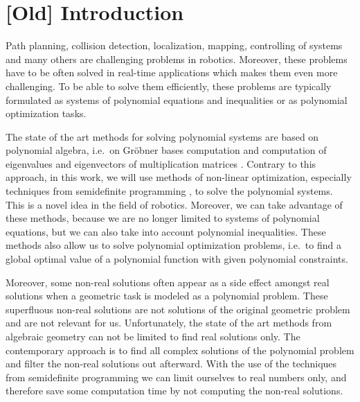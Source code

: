 \chapter{[Old] Introduction}
Path planning, collision detection, localization, mapping, controlling of systems and many others are challenging problems in robotics.
Moreover, these problems have to be often solved in real-time applications which makes them even more challenging.
To be able to solve them efficiently, these problems are typically formulated as systems of polynomial equations and inequalities or as polynomial optimization tasks.

The state of the art methods for solving polynomial systems are based on polynomial algebra, i.e.\ on Gr\"obner bases computation and computation of eigenvalues and eigenvectors of multiplication matrices \cite{Cox-Little-Shea2015}.
Contrary to this approach, in this work, we will use methods of non-linear optimization, especially techniques from semidefinite programming \cite{Lasserre}, to solve the polynomial systems.
This is a novel idea in the field of robotics.
Moreover, we can take advantage of these methods, because we are no longer limited to systems of polynomial equations, but we can also take into account polynomial inequalities.
These methods also allow us to solve polynomial optimization problems, i.e.\ to find a global optimal value of a polynomial function with given polynomial constraints.

Moreover, some non-real solutions often appear as a side effect amongst real solutions when a geometric task is modeled as a polynomial problem.
These superfluous non-real solutions are not solutions of the original geometric problem and are not relevant for us.
Unfortunately, the state of the art methods from algebraic geometry can not be limited to find real solutions only.
The contemporary approach is to find all complex solutions of the polynomial problem and filter the non-real solutions out afterward.
With the use of the techniques from semidefinite programming \cite{Laurent2012} we can limit ourselves to real numbers only, and therefore save some computation time by not computing the non-real solutions.
